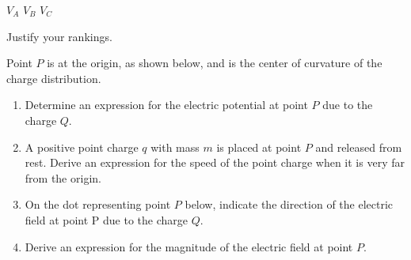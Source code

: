 \documentclass{../../../oss-apphys}
\begin{document}
\begin{enumerate}[leftmargin=15pt]
\begin{enumerate}[leftmargin=15pt]
    \vspace{.1in}
    \underline{\hspace{.3in} } $V_A$ \hspace{.3in}
    \underline{\hspace{.3in} } $V_B$ \hspace{.3in}
    \underline{\hspace{.3in} } $V_C$
    
    \vspace{.1in}Justify your rankings.
  \end{enumerate}
  \vspace{.14in}
  Point $P$ is at the origin, as shown below, and is the center of curvature of
  the charge distribution.
  \begin{center}
  \end{center}
  \begin{enumerate}[leftmargin=15pt,resume]
  \item Determine an expression for the electric potential at point $P$ due to
    the charge $Q$.
    
  \item A positive point charge $q$ with mass $m$ is placed at point $P$ and
    released from rest. Derive an expression for the speed of the point charge
    when it is very far from the origin.
    \newpage
    
  \item On the dot representing point $P$ below, indicate the direction of the
    electric field at point P due to the charge $Q$.
    \begin{center}
    \end{center}
  \item Derive an expression for the magnitude of the electric field at point
    $P$.
  \end{enumerate}
  \vspace{2in}
  

\end{enumerate}
\end{document}

